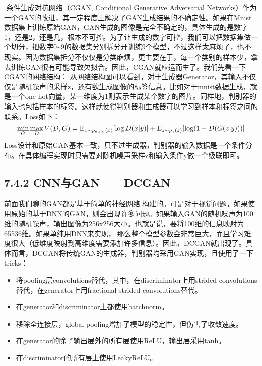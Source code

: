 ​ 条件生成对抗网络（CGAN, Conditional Generative Adversarial
Networks）作为一个GAN的改进，其一定程度上解决了GAN生成结果的不确定性。如果在Mnist数据集上训练原始GAN，GAN生成的图像是完全不确定的，具体生成的是数字1，还是2，还是几，根本不可控。为了让生成的数字可控，我们可以把数据集做一个切分，把数字0\textasciitilde{}9的数据集分别拆分开训练9个模型，不过这样太麻烦了，也不现实。因为数据集拆分不仅仅是分类麻烦，更主要在于，每一个类别的样本少，拿去训练GAN很有可能导致欠拟合。因此，CGAN就应运而生了。我们先看一下CGAN的网络结构：
从网络结构图可以看到，对于生成器Generator，其输入不仅仅是随机噪声的采样z，还有欲生成图像的标签信息。比如对于mnist数据生成，就是一个one-hot向量，某一维度为1则表示生成某个数字的图片。同样地，判别器的输入也包括样本的标签。这样就使得判别器和生成器可以学习到样本和标签之间的联系。Loss如下：
\[
\mathop {\min }\limits_G \mathop {\max }\limits_D V(D,G) = {\rm E}_{x\sim{p_{data}(x)}}[\log D(x|y)] + {\rm E}_{z\sim{p_z}(z)}[\log (1 - D(G(z|y)))]
\] ​
Loss设计和原始GAN基本一致，只不过生成器，判别器的输入数据是一个条件分布。在具体编程实现时只需要对随机噪声采样z和输入条件y做一个级联即可。

\subsection{7.4.2 CNN与GAN------DCGAN}\label{cnnux4e0egandcgan}

​
前面我们聊的GAN都是基于简单的神经网络构建的。可是对于视觉问题，如果使用原始的基于DNN的GAN，则会出现许多问题。如果输入GAN的随机噪声为100维的随机噪声，输出图像为256x256大小。也就是说，要将100维的信息映射为65536维。如果单纯用DNN来实现，那么整个模型参数会非常巨大，而且学习难度很大（低维度映射到高维度需要添加许多信息）。因此，DCGAN就出现了。具体而言，DCGAN将传统GAN的生成器，判别器均采用GAN实现，且使用了一下tricks：

\begin{itemize}
\item
  将pooling层convolutions替代，其中，在discriminator上用strided
  convolutions替代，在generator上用fractional-strided convolutions替代。
\item
  在generator和discriminator上都使用batchnorm。
\item
  移除全连接层，global pooling增加了模型的稳定性，但伤害了收敛速度。
\item
  在generator的除了输出层外的所有层使用ReLU，输出层采用tanh。
\item
  在discriminator的所有层上使用LeakyReLU。
\end{itemize}

